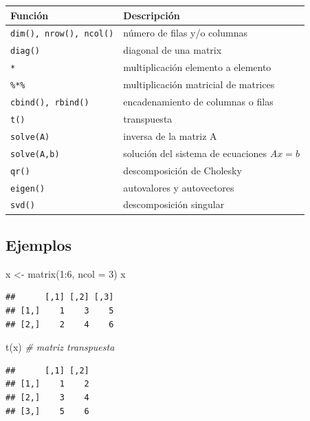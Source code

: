 \documentclass[
]{book}
\newenvironment{Shaded}{\begin{snugshade}}{\end{snugshade}}
\newcommand{\AttributeTok}[1]{\textcolor[rgb]{0.77,0.63,0.00}{#1}}
\newcommand{\CommentTok}[1]{\textcolor[rgb]{0.56,0.35,0.01}{\textit{#1}}}
\newcommand{\DecValTok}[1]{\textcolor[rgb]{0.00,0.00,0.81}{#1}}
\newcommand{\FunctionTok}[1]{\textcolor[rgb]{0.00,0.00,0.00}{#1}}
\newcommand{\NormalTok}[1]{#1}
\newcommand{\OtherTok}[1]{\textcolor[rgb]{0.56,0.35,0.01}{#1}}
\newcommand{\SpecialCharTok}[1]{\textcolor[rgb]{0.00,0.00,0.00}{#1}}
\theoremstyle{break}
\theoremstyle{nonumberplain}
\begin{document}
\begin{longtable}[]{@{}ll@{}}
\toprule
Función & Descripción \\
\midrule
\endhead
\texttt{dim(),\ nrow(),\ ncol()} & número de filas y/o columnas \\
\texttt{diag()} & diagonal de una matrix \\
\texttt{*} & multiplicación elemento a elemento \\
\texttt{\%*\%} & multiplicación matricial de matrices \\
\texttt{cbind(),\ rbind()} & encadenamiento de columnas o filas \\
\texttt{t()} & transpuesta \\
\texttt{solve(A)} & inversa de la matriz A \\
\texttt{solve(A,b)} & solución del sistema de ecuaciones \(Ax=b\) \\
\texttt{qr()} & descomposición de Cholesky \\
\texttt{eigen()} & autovalores y autovectores \\
\texttt{svd()} & descomposición singular \\
\bottomrule
\end{longtable}

\hypertarget{ejemplos}{%
\subsection{Ejemplos}\label{ejemplos}}

\begin{Shaded}
\begin{Highlighting}[]
\NormalTok{x }\OtherTok{\textless{}{-}} \FunctionTok{matrix}\NormalTok{(}\DecValTok{1}\SpecialCharTok{:}\DecValTok{6}\NormalTok{, }\AttributeTok{ncol =} \DecValTok{3}\NormalTok{)}
\NormalTok{x}
\end{Highlighting}
\end{Shaded}

\begin{verbatim}
##      [,1] [,2] [,3]
## [1,]    1    3    5
## [2,]    2    4    6
\end{verbatim}

\begin{Shaded}
\begin{Highlighting}[]
\FunctionTok{t}\NormalTok{(x)  }\CommentTok{\# matriz transpuesta}
\end{Highlighting}
\end{Shaded}

\begin{verbatim}
##      [,1] [,2]
## [1,]    1    2
## [2,]    3    4
## [3,]    5    6
\end{verbatim}
\end{document}
